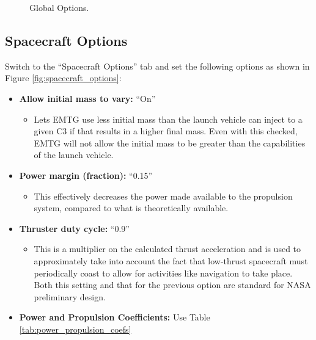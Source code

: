 \documentclass[11pt]{article}
\begin{document}
\begin{figure}[H]
	\centering
	\caption{\label{fig:global_options}Global Options.}
\end{figure}

\subsection{Spacecraft Options}
\label{sec:spacecraft_options}

Switch to the ``Spacecraft Options'' tab and set the following options as shown in Figure \ref{fig:spacecraft_options}:

\begin{itemize}
	\item \textbf{Allow initial mass to vary:} ``On''
	\begin{itemize}
		\item Lets \ac{EMTG} use less initial mass than the launch vehicle can inject to a given C3 if that results in a higher final mass. Even with this checked, \ac{EMTG} will not allow the initial mass to be greater than the capabilities of the launch vehicle. 
	\end{itemize}
	\item \textbf{Power margin (fraction):} ``0.15''
	\begin{itemize}
		\item This effectively decreases the power made available to the propulsion system, compared to what is theoretically available.
	\end{itemize}
	\item \textbf{Thruster duty cycle:} ``0.9''
	\begin{itemize}
		\item This is a multiplier on the calculated thrust acceleration and is used to approximately take into account the fact that low-thrust spacecraft must periodically coast to allow for activities like navigation to take place. Both this setting and that for the previous option are standard for \acs{NASA} preliminary design.
	\end{itemize}
	\item \textbf{Power and Propulsion Coefficients:} Use Table \ref{tab:power_propulsion_coefs}

\end{itemize}
\end{document}
